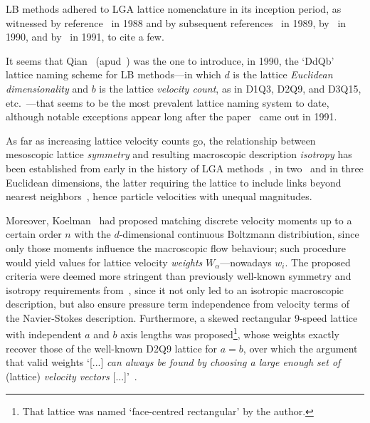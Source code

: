     LB   methods   adhered    to    LGA    lattice    nomenclature    in    its    inception    period,    as    witnessed    by
    reference~\cite{1988-McNamaraGR+ZanettiG-PhysRevLett}          in          1988          and          by          subsequent
    references~\cite{1989-HigueraFJ+JimenezJ-EurophysLett,         1989-HigueraFJ+SucciS-EurophysLett}         in          1989,
    by~\cite{1990-BenziR+VergassolaM-EurophysLett,   1990-BenziR+VergassolaM-NuclPhysB,    1990-CancelliereA+SucciS-PhysFluidsA,
    1990-VergassolaM+SucciS-EurophysLett}   in   1990,   and   by~\cite{1991-CornubertR+LevermoreD-PhysD,    1991-ErnstMH-PhysD,
    1991-FrischU-PhysD, 1991-GunstensenAK+ZanettiG-PhysRevA, 1991-SucciS+BenziR-PhysRevA} in 1991, to cite a few.

    It seems that Qian~\cite{1990-QianYH-Paris} (apud~\cite[p.~235]{1993-QianYH-JSciComput}) was the one to introduce, in  1990,
    the `DdQb' lattice naming scheme for LB methods---in which $d$ is the lattice \emph{Euclidean dimensionality} and $b$ is the
    lattice  \emph{velocity   count},   as   in   D1Q3,   D2Q9,   and   D3Q15,   etc.~\cite{1992-QianYH+LallemandP-EurophysLett,
    1993-QianYH+OrszagSA-EuroPhysLett}---that seems to be the most prevalent lattice naming system  to  date,  although  notable
    exceptions appear long after the paper~\cite{1991-QianYH+LallemandP-AdvKinTheoContMech} came out in 1991.

    As far as increasing lattice velocity counts go, the relationship between mesoscopic lattice \emph{symmetry}  and  resulting
    macroscopic   description   \emph{isotropy}   has   been   established    from    early    in    the    history    of    LGA
    methods~\cite{1973-HardyJ+PazzisO-JMathPhys, 1976-HardyJ+PomeauY-PhysRevA},  in  two~\cite{1986-FrischU+PomeauY-PhysRevLett}
    and  in  three  Euclidean   dimensions,   the   latter   requiring   the   lattice   to   include   links   beyond   nearest
    neighbors~\cite[pp.~473, 490]{1986-WolframS-JStatPhys}, hence particle velocities with unequal magnitudes.

    Moreover, Koelman~\cite{1991-KoelmanJMVA-EurophysLett} had proposed matching discrete velocity moments up to a certain order
    $n$ with the $d$-dimensional continuous Boltzmann distribiution, since only those moments  influence  the  macroscopic  flow
    behaviour; such procedure would yield values for lattice velocity \emph{weights} $W_{\alpha}$---nowadays $w_i$. The proposed
    criteria   were   deemed   more   stringent   than   previously    well-known    symmetry    and    isotropy    requirements
    from~\cite{1986-WolframS-JStatPhys}, since it not only led to an isotropic macroscopic description, but also ensure pressure
    term independence from velocity terms of the Navier-Stokes description. Furthermore, a skewed  rectangular  9-speed  lattice
    with independent $a$ and $b$ axis lengths was proposed\footnote{That lattice was named  `face-centred  rectangular'  by  the
    author.}, whose weights exactly recover those of the well-known D2Q9 lattice for $a = b$, over which the argument that valid
    weights `[...] \emph{can  always  be  found  by  choosing  a  large  enough  set  of}  (lattice)  \emph{velocity  vectors\/}
    [...]'~\cite{1991-KoelmanJMVA-EurophysLett}.

